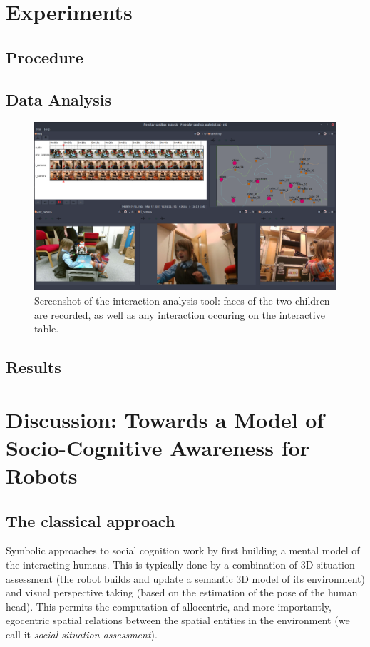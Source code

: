 \documentclass[a4paper]{article}
\begin{document}
\section{Experiments}

\subsection{Procedure}

\subsection{Data Analysis}

\begin{figure}
    \centering
    \includegraphics[width=\linewidth]{analysis}
    \caption{Screenshot of the interaction analysis tool: faces of the two
    children are recorded, as well as any interaction occuring on the
    interactive table.}
    \label{fig|analysis}
\end{figure}

\subsection{Results}

\section{Discussion: Towards a Model of Socio-Cognitive Awareness for Robots}

\subsection{The classical approach}


Symbolic approaches to social cognition work by first building a mental model of the
interacting humans. This is typically done by a combination of 3D situation
assessment (the robot builds and update a semantic 3D model of its environment)
and visual perspective taking (based on the estimation of the pose of the human
head). This permits the computation of allocentric, and more importantly,
egocentric spatial relations between the spatial entities in the environment
(we call it \emph{social situation assessment}).
\end{document}
